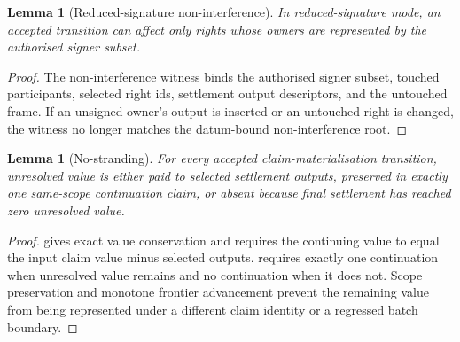 \documentclass[a4paper,11pt]{article}
\theoremstyle{definition}
\theoremstyle{plain}
\newtheorem{lemma}[definition]{Lemma}
\theoremstyle{remark}
\begin{document}
\begin{lemma}[Reduced-signature non-interference]
\label{lem:noninterference}
In reduced-signature mode, an accepted transition can affect only rights whose
owners are represented by the authorised signer subset.
\end{lemma}

\begin{proof}
The non-interference witness binds the authorised signer subset, touched
participants, selected right ids, settlement output descriptors, and the
untouched frame. If an unsigned owner's output is inserted or an untouched
right is changed, the witness no longer matches the datum-bound
non-interference root.
\end{proof}

\begin{lemma}[No-stranding]
\label{lem:no-stranding}
For every accepted claim-materialisation transition, unresolved value is either
paid to selected settlement outputs, preserved in exactly one same-scope
continuation claim, or absent because final settlement has reached zero
unresolved value.
\end{lemma}

\begin{proof}
 gives exact value conservation and requires
the continuing value to equal the input claim value minus selected outputs.
 requires exactly one continuation when unresolved value
remains and no continuation when it does not. Scope preservation and monotone
frontier advancement prevent the remaining value from being represented under a
different claim identity or a regressed batch boundary.
\end{proof}
\end{document}
